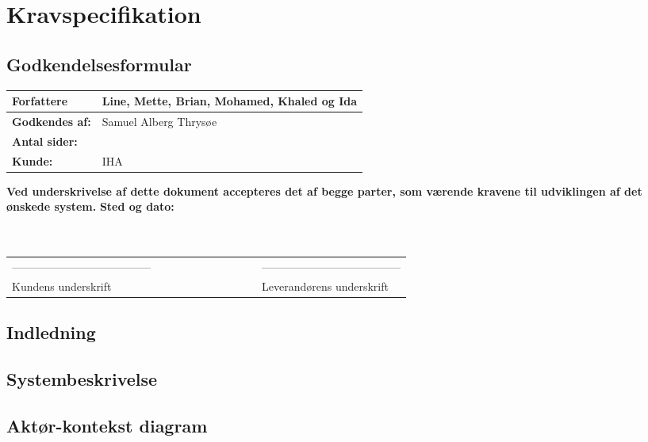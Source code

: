 \chapter{Kravspecifikation}
\section{Godkendelsesformular}
\begin{table}[h!]
\label{tab:tabel2}
\begin{tabular}{| l | >{\raggedright\arraybackslash}p{12cm} |}
   \hline
   \textbf{Forfattere} & Line, Mette, Brian, Mohamed, Khaled og Ida\\ \hline
   \textbf{Godkendes af:} & Samuel Alberg Thrysøe\\ \hline
   \textbf{Antal sider:} & \\ \hline
   \textbf{Kunde:} & IHA\\ \hline
\end{tabular}
\end{table}
\textbf{Ved underskrivelse af dette dokument accepteres det af begge parter, som værende kravene til udviklingen af det ønskede system.}
\newline
\textbf{Sted og dato:}\\
\\
\\
\begin{table}
[h!]
\begin{tabular}{ l lllllllll l}
--------------------------------------&&&&&&&&&&--------------------------------------\\ 
Kundens underskrift &&&&&&&&&&Leverandørens underskrift\\
\end{tabular}
\end{table}
\section{Indledning}

\section{Systembeskrivelse}

\section{Aktør-kontekst diagram}

